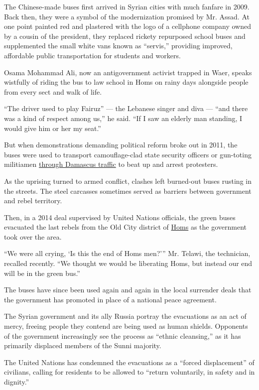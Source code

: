 The Chinese-made buses first arrived in Syrian cities with much fanfare
in 2009. Back then, they were a symbol of the modernization promised by
Mr. Assad. At one point painted red and plastered with the logo of a
cellphone company owned by a cousin of the president, they replaced
rickety repurposed school buses and supplemented the small white vans
known as ``servis,'' providing improved, affordable public
transportation for students and workers.

Osama Mohammad Ali, now an antigovernment activist trapped in Waer,
speaks wistfully of riding the bus to law school in Homs on rainy days
alongside people from every sect and walk of life.

``The driver used to play Fairuz'' --- the Lebanese singer and diva ---
``and there was a kind of respect among us,'' he said. ``If I saw an
elderly man standing, I would give him or her my seat.''

But when demonstrations demanding political reform broke out in 2011,
the buses were used to transport camouflage-clad state security officers
or gun-toting militiamen
\href{https://www.youtube.com/watch?v=UMC8W0fGHk4}{through Damascus
traffic} to beat up and arrest protesters.

As the uprising turned to armed conflict, clashes left burned-out buses
rusting in the streets. The steel carcasses sometimes served as barriers
between government and rebel territory.

Then, in a 2014 deal supervised by United Nations officials, the green
buses evacuated the last rebels from the Old City district of
\href{http://www.nytimes3xbfgragh.onion/2014/05/08/world/middleeast/syria.html}{Homs}
as the government took over the area.

``We were all crying, `Is this the end of Homs men?''' Mr. Telawi, the
technician, recalled recently. ``We thought we would be liberating Homs,
but instead our end will be in the green bus.''

The buses have since been used again and again in the local surrender
deals that the government has promoted in place of a national peace
agreement.

The Syrian government and its ally Russia portray the evacuations as an
act of mercy, freeing people they contend are being used as human
shields. Opponents of the government increasingly see the process as
``ethnic cleansing,'' as it has primarily displaced members of the Sunni
majority.

The United Nations has condemned the evacuations as a ``forced
displacement'' of civilians, calling for residents to be allowed to
``return voluntarily, in safety and in dignity.''

